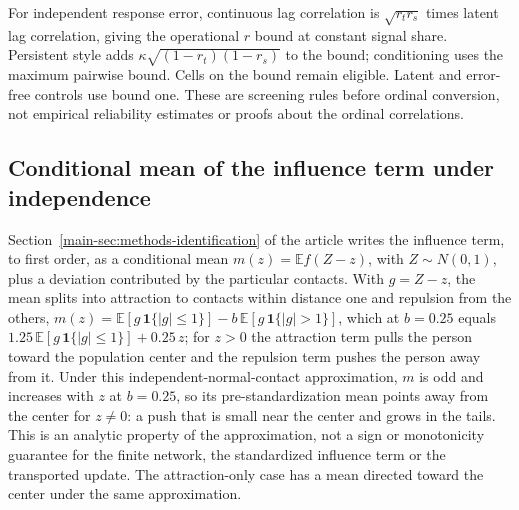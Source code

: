 For independent response error, continuous lag correlation is $\sqrt{r_t r_s}$ times latent lag correlation, giving the operational $r$ bound at constant signal share. Persistent style adds $\kappa\sqrt{(1-r_t)(1-r_s)}$ to the bound; conditioning uses the maximum pairwise bound. Cells on the bound remain eligible. Latent and error-free controls use bound one. These are screening rules before ordinal conversion, not empirical reliability estimates or proofs about the ordinal correlations.

\subsection{Conditional mean of the influence term under independence}\label{sec:dd-drift-mean}\label{supp:drift-mean}

Section~\ref{main-sec:methods-identification} of the article writes the influence term, to first order, as a conditional mean $m(z)=\mathbb E f(Z-z)$, with $Z\sim N(0,1)$, plus a deviation contributed by the particular contacts.
With $g=Z-z$, the mean splits into attraction to contacts within distance one and repulsion from the others, $m(z)=\mathbb E[g\,\mathbf 1\{|g|\le1\}]-b\,\mathbb E[g\,\mathbf 1\{|g|>1\}]$, which at $b=0.25$ equals $1.25\,\mathbb E[g\,\mathbf 1\{|g|\le1\}]+0.25\,z$; for $z>0$ the attraction term pulls the person toward the population center and the repulsion term pushes the person away from it. Under this independent-normal-contact approximation, $m$ is odd and increases with $z$ at $b=0.25$, so its pre-standardization mean points away from the center for $z\neq0$: a push that is small near the center and grows in the tails. This is an analytic property of the approximation, not a sign or monotonicity guarantee for the finite network, the standardized influence term or the transported update. The attraction-only case has a mean directed toward the center under the same approximation.


